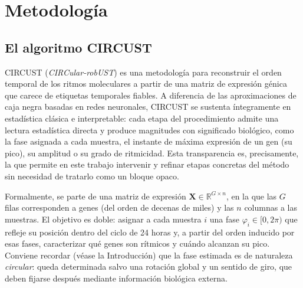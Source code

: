 \documentclass[12pt, a4paper]{report}
\begin{document}
\chapter{Metodología}
\label{cap:metodologia}

\section{El algoritmo CIRCUST}
\label{sec:circust}

CIRCUST (\textit{CIRCular-robUST}) \cite{larriba2023} es una metodología para reconstruir el orden temporal de los ritmos moleculares a partir de una matriz de expresión génica que carece de etiquetas temporales fiables. A diferencia de las aproximaciones de caja negra basadas en redes neuronales, CIRCUST se sustenta íntegramente en estadística clásica e interpretable: cada etapa del procedimiento admite una lectura estadística directa y produce magnitudes con significado biológico, como la fase asignada a cada muestra, el instante de máxima expresión de un gen (su pico), su amplitud o su grado de ritmicidad. Esta transparencia es, precisamente, la que permite en este trabajo intervenir y refinar etapas concretas del método sin necesidad de tratarlo como un bloque opaco.

Formalmente, se parte de una matriz de expresión $\mathbf{X}\in\mathbb{R}^{G\times n}$, en la que las $G$ filas corresponden a genes (del orden de decenas de miles) y las $n$ columnas a las muestras. El objetivo es doble: asignar a cada muestra $i$ una fase $\varphi_i\in[0,2\pi)$ que refleje su posición dentro del ciclo de 24 horas y, a partir del orden inducido por esas fases, caracterizar qué genes son rítmicos y cuándo alcanzan su pico. Conviene recordar (véase la Introducción) que la fase estimada es de naturaleza \emph{circular}: queda determinada salvo una rotación global y un sentido de giro, que deben fijarse después mediante información biológica externa.
\end{document}
